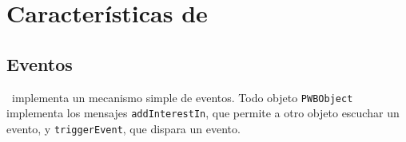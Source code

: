 \section{Características de \PITS}




\subsection{Eventos}
\label{sub-events}
\PWB \ implementa un mecanismo simple de eventos. Todo objeto \verb"PWBObject" implementa los mensajes \verb"addInterestIn", que permite a otro objeto escuchar un evento, y \verb"triggerEvent", que dispara un evento.

